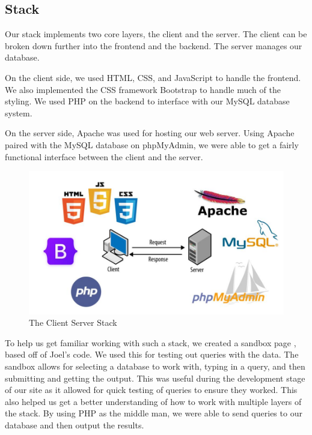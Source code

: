 \documentclass[sigconf]{acmart}
\begin{document}
\subsection{Stack}
Our stack implements two core layers, the client and the server. The client can be broken down further into the frontend and the backend. The server manages our database.

On the client side, we used HTML, CSS, and JavaScript to handle the frontend. We also implemented the CSS framework Bootstrap to handle much of the styling. We used PHP on the backend to interface with our MySQL database system.

On the server side, Apache was used for hosting our web server. Using Apache paired with the MySQL database on phpMyAdmin, we were able to get a fairly functional interface between the client and the server.

\begin{figure}[H]
  \label{Stack}
  \centering
  \includegraphics[width=\linewidth]{Images/ClientServer.jpg}
  \caption{The Client Server Stack}
\end{figure}

To help us get familiar working with such a stack, we created a sandbox page \cite{Sandbox}, based off of Joel’s code. We used this for testing out queries with the data. The sandbox allows for selecting a database to work with, typing in a query, and then submitting and getting the output. This was useful during the development stage of our site as it allowed for quick testing of queries to ensure they worked. This also helped us get a better understanding of how to work with multiple layers of the stack. By using PHP as the middle man, we were able to send queries to our database and then output the results.
\end{document}
